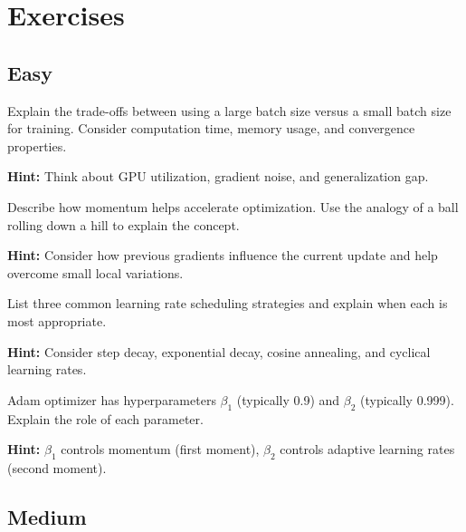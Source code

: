 
\section*{Exercises}

\subsection*{Easy}

\begin{problem}
Explain the trade-offs between using a large batch size versus a small batch size for training. Consider computation time, memory usage, and convergence properties.

\textbf{Hint:} Think about GPU utilization, gradient noise, and generalization gap.
\end{problem}

\begin{problem}
Describe how momentum helps accelerate optimization. Use the analogy of a ball rolling down a hill to explain the concept.

\textbf{Hint:} Consider how previous gradients influence the current update and help overcome small local variations.
\end{problem}

\begin{problem}
List three common learning rate scheduling strategies and explain when each is most appropriate.

\textbf{Hint:} Consider step decay, exponential decay, cosine annealing, and cyclical learning rates.
\end{problem}

\begin{problem}
Adam optimizer has hyperparameters $\beta_1$ (typically 0.9) and $\beta_2$ (typically 0.999). Explain the role of each parameter.

\textbf{Hint:} $\beta_1$ controls momentum (first moment), $\beta_2$ controls adaptive learning rates (second moment).
\end{problem}

\subsection*{Medium}


